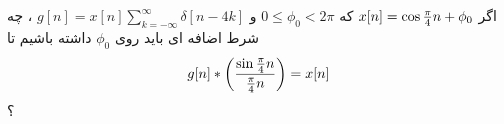 \documentclass[10pt,letterpaper]{article}
\newcommand{\nl}{\newline\newline}
\newcounter{QuestionNumber}
\newcommand{\Q}{
\textbf{
سوال \theQuestionNumber)
}
\stepcounter{QuestionNumber}
}
\newcommand{\figno}[1]{
\begin{figure}[h!]
#1
\end{figure}
}
\newcommand{\subfigno}[2]{
\begin{subfigure}{#2}
#1
\end{subfigure}
}
\begin{document}
اگر 
$
x[n]=\cos {\pi\over 4}n+\phi_0
$
 که
$
0\le \phi_0<2\pi
$
و
$
g[n]=x[n]\sum_{k=-\infty}^{\infty}\delta[n-4k]
$
، چه شرط اضافه ای باید روی $\phi_0$ داشته باشیم تا
$$
g[n]*\left({\sin {\pi\over 4}n\over {\pi\over 4}n}\right)=x[n]
$$
؟
\nl
%
%
%
%
%
%
%
%
%
%
\end{document}
